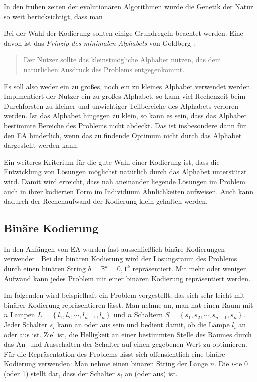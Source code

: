 In den frühen zeiten der evolutionären Algorithmen wurde die Genetik der Natur so weit berücksichtigt, dass man

Bei der Wahl der Kodierung sollten einige Grundregeln beachtet werden. Eine davon ist das \textit{Prinzip des minimalen Alphabets} von Goldberg \cite{Golderg:1}: 

\begin{quote}
Der Nutzer sollte das kleinstmögliche Alphabet nutzen, das dem natürlichen Ausdruck des Problems entgegenkommt.
\end{quote}

Es soll also weder ein zu großes, noch ein zu kleines Alphabet verwendet werden. Implmentiert der Nutzer ein zu großes Alphabet, so kann viel Rechenzeit beim Durchforsten zu kleiner und unwichtiger Teilbereiche des Alphabets verloren werden. Ist das Alphabet hingegen zu klein, so kann es sein, dass das Alphabet bestimmte Bereiche des Problems nicht abdeckt. Das ist insbesondere dann für den EA hinderlich, wenn das zu findende Optimum nicht durch das Alphabet dargestellt werden kann. 

Ein weiteres Kriterium für die gute Wahl einer Kodierung ist, dass die Entwicklung von Lösungen möglichst natürlich durch das Alphabet unterstützt wird. Damit wird erreicht, dass nah aneinander liegende Lösungen im Problem auch in ihrer kodierten Form im Individuum Ähnlichkeiten aufweisen. Auch kann dadurch der Rechenaufwand der Kodierung klein gehalten werden. 

\subsection{Binäre Kodierung}
\label{subsec:binary_coding}
In den Anfängen von \acs{EA} wurden fast ausschließlich binäre Kodierungen verwendet \cite{Gerdes:1}. 
Bei der binären Kodierung wird der Lösungsraum des Problems durch einen binären String $b = \mathbb{B}^k = {0, 1}^k$ repräsentiert. Mit mehr oder weniger Aufwand kann jedes Problem mit einer binären Kodierung repräsentiert werden. 

Im folgenden wird beispielhaft ein Problem vorgestellt, das sich sehr leicht mit binärer Kodierung repräsentieren lässt. Man nehme an, man hat einen Raum mit $n$ Lampen $L = \left\{l_1, l_2, \cdots , l_{n-1}, l_n\right\}$ und $n$ Schaltern $S = \left\{s_1, s_2, \cdots , s_{n-1}, s_n\right\}$. Jeder Schalter $s_i$ kann an oder aus sein und bedient damit, ob die Lampe $l_i$ an oder aus ist. Ziel ist, die Helligkeit an einer bestimmten Stelle des Raumes durch das An- und Ausschalten der Schalter auf einen gegebenen Wert zu optimieren. Für die Repräsentation des Problems lässt sich offensichtlich eine binäre Kodierung verwenden: Man nehme einen binären String der Länge $n$. Die $i$-te 0 (oder 1) stellt dar, dass der Schalter $s_i$ an (oder aus) ist. 

